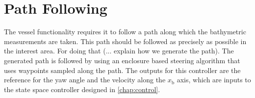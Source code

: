 \chapter{Path Following}
The vessel functionality requires it to follow a path along which the bathymetric measurements are taken. This path should be followed as precisely as possible in the interest area. For doing that (... explain how we generate the path). The generated path is followed by using an enclosure based steering algorithm \cite[pp. 258-265]{TFossen} that uses waypoints sampled along the path. The outputs for this controller are the reference for the yaw angle and the velocity along the $x_\mathrm{b}$ axis, which are inputs to the state space controller designed in \autoref{chap:control}. 